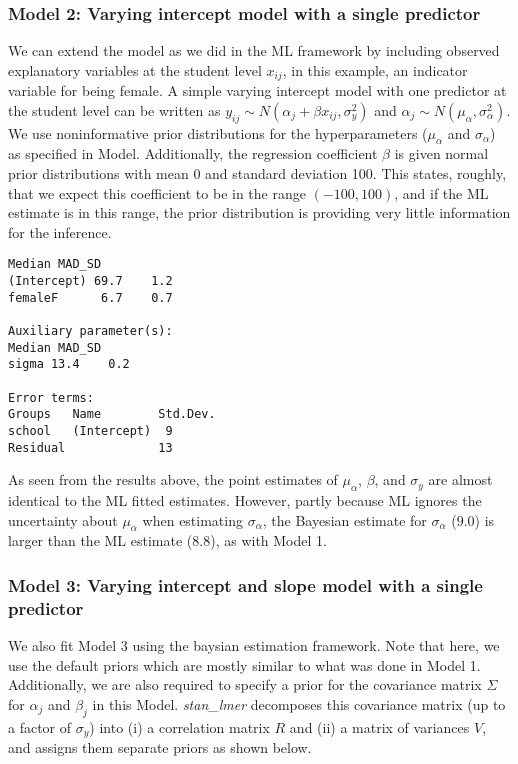 \subsubsection*{Model 2: Varying intercept model with a single predictor}
We can extend the model as we did in the ML framework by including observed explanatory variables at the student level $x_{ij}$, in this example, an indicator variable for being female. A simple varying intercept model with one predictor at the student level can be written as $y_{ij} \sim N(\alpha_{j} + \beta x_{ij}, \sigma_{y}^{2})$ and $\alpha_{j} \sim N(\mu_{\alpha}, \sigma_{\alpha}^{2})$. We use noninformative prior distributions for the hyperparameters ($\mu_{\alpha}$ and $\sigma_{\alpha}$) as specified in Model. Additionally, the regression coefficient $\beta$ is given normal prior distributions with mean 0 and standard deviation 100. This states, roughly, that we expect this coefficient to be in the range $(-100, 100)$, and if the ML estimate is in this range, the prior distribution is providing very little information for the inference.  

\newpage
\begin{Verbatim}[frame=single]
Median MAD_SD
(Intercept) 69.7    1.2  
femaleF      6.7    0.7  

Auxiliary parameter(s):
Median MAD_SD
sigma 13.4    0.2  

Error terms:
Groups   Name        Std.Dev.
school   (Intercept)  9      
Residual             13    
\end{Verbatim}
As seen from the results above, the point estimates of $\mu_{\alpha}$, $\beta$, and $\sigma_{y}$ are almost identical to the ML fitted estimates. However, partly because ML ignores the uncertainty about $\mu_{\alpha}$ when estimating $\sigma_{\alpha}$, the Bayesian estimate for $\sigma_{\alpha}$ ($9.0$) is larger than the ML estimate ($8.8$), as with Model 1.

\subsubsection*{Model 3: Varying intercept and slope model with a single predictor}

We also fit Model 3 using the baysian estimation framework.  Note that here, we use the default priors which are mostly similar to what was done in Model 1.  Additionally, we are also required to specify a prior for the covariance matrix $\Sigma$ for $\alpha_j$ and $\beta_j$ in this Model.  \textit{stan\_lmer} decomposes this covariance matrix (up to a factor of $\sigma_y$) into (i) a correlation matrix $R$ and (ii) a matrix of variances $V$, and assigns them separate priors as shown below.


